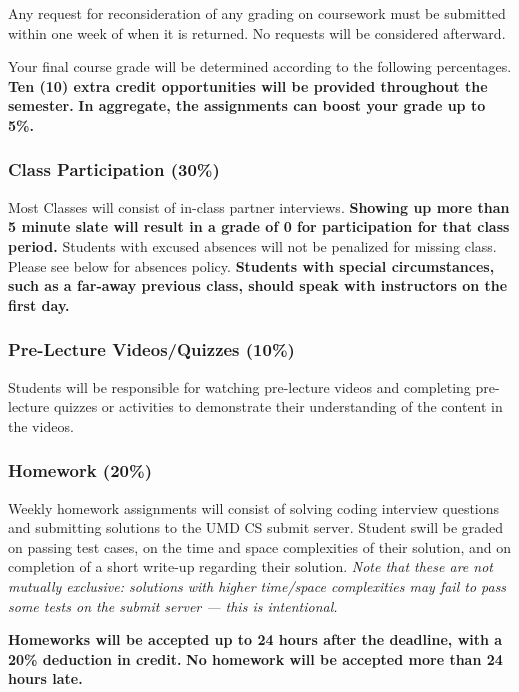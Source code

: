 \documentclass[12pt]{article}
\begin{document}
Any request for reconsideration of any grading on coursework must be submitted within one week of when it is returned.
No requests will be considered afterward.

Your final course grade will be determined according to the following percentages.
\textbf{Ten (10) extra credit opportunities will be provided throughout the semester.}
\textbf{In aggregate, the assignments can boost your grade up to 5\%.} \medskip

\subsubsection*{Class Participation (30\%)}

\noindent Most Classes will consist of in-class partner interviews.
\textbf{Showing up more than 5 minute slate will result in a grade of 0 for participation for that class period.}
Students with excused absences will not be penalized for missing class.
Please see below for absences policy.
\textbf{​Students with special circumstances, such as a far-away previous class, should speak with instructors on the first day.}

\subsubsection*{Pre-Lecture Videos/Quizzes (10\%)}
Students will be responsible for watching pre-lecture videos and
completing pre-lecture quizzes or activities to demonstrate their understanding of the content in the videos.

\subsubsection*{Homework (20\%)}
Weekly homework assignments will consist of solving coding interview questions and submitting solutions to the UMD CS submit server.
Student swill be graded on passing test cases, on the time and space complexities of their solution, and on completion of a short write-up regarding their solution.
{\em Note that these are not mutually exclusive: solutions with higher time/space complexities may fail to pass some tests on the submit server --- this is intentional.}

\textbf{Homeworks will be accepted up to 24 hours after the deadline, with a 20\% deduction in credit.}
\textbf{No homework will be accepted more than 24 hours late.}
\end{document}
